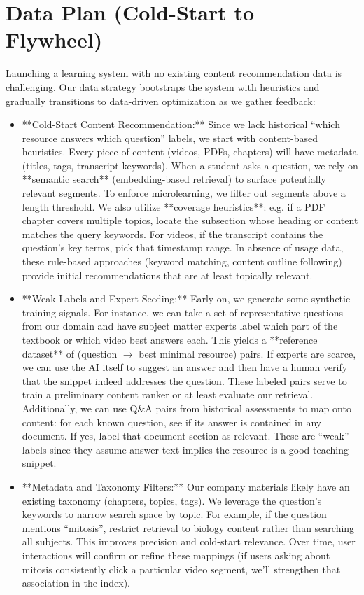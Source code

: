 \documentclass[11pt]{article}
\begin{document}
\section{Data Plan (Cold-Start to Flywheel)}
Launching a learning system with no existing content recommendation data is challenging. Our data strategy bootstraps the system with heuristics and gradually transitions to data-driven optimization as we gather feedback:
\begin{itemize}
  \item **Cold-Start Content Recommendation:** Since we lack historical “which resource answers which question” labels, we start with content-based heuristics. Every piece of content (videos, PDFs, chapters) will have metadata (titles, tags, transcript keywords). When a student asks a question, we rely on **semantic search** (embedding-based retrieval) to surface potentially relevant segments. To enforce microlearning, we filter out segments above a length threshold. We also utilize **coverage heuristics**: e.g. if a PDF chapter covers multiple topics, locate the subsection whose heading or content matches the query keywords. For videos, if the transcript contains the question’s key terms, pick that timestamp range. In absence of usage data, these rule-based approaches (keyword matching, content outline following) provide initial recommendations that are at least topically relevant.
  \item **Weak Labels and Expert Seeding:** Early on, we generate some synthetic training signals. For instance, we can take a set of representative questions from our domain and have subject matter experts label which part of the textbook or which video best answers each. This yields a **reference dataset** of (question $\to$ best minimal resource) pairs. If experts are scarce, we can use the AI itself to suggest an answer and then have a human verify that the snippet indeed addresses the question. These labeled pairs serve to train a preliminary content ranker or at least evaluate our retrieval. Additionally, we can use Q\&A pairs from historical assessments to map onto content: for each known question, see if its answer is contained in any document. If yes, label that document section as relevant. These are “weak” labels since they assume answer text implies the resource is a good teaching snippet.
  \item **Metadata and Taxonomy Filters:** Our company materials likely have an existing taxonomy (chapters, topics, tags). We leverage the question’s keywords to narrow search space by topic. For example, if the question mentions “mitosis”, restrict retrieval to biology content rather than searching all subjects. This improves precision and cold-start relevance. Over time, user interactions will confirm or refine these mappings (if users asking about mitosis consistently click a particular video segment, we’ll strengthen that association in the index).

\end{itemize}
\end{document}
